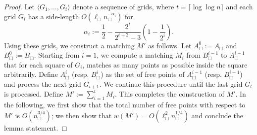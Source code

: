 \documentclass[11pt,onecolumn]{article}
\newcommand{\cell}{\Box}
\begin{document}
\GRSPartialMatching*
\begin{proof}
    Let $\langle G_1, \ldots, G_t\rangle$ denote a sequence of grids, where $t=\lceil \log\log n\rceil$ and each grid $G_i$ has a side-length $O(\ell_\cell n_\cell^{-\alpha_i})$ for \[\alpha_i:=\frac{1}{2} - \frac{2^t}{2^{t+2} - 3}\left(1-\frac{1}{2^i}\right).\]
    Using these grids, we construct a matching $M'$ as follows.
    Let $A_\cell^0:=A_\cell$ and $B_\cell^0:=B_\cell$. Starting from $i=1$, we compute a matching $M_i$ from $B_\cell^{i-1}$ to $A_\cell^{i-1}$ that for each square of $G_i$, matches as many points as possible inside the square arbitrarily. Define $A_\cell^i$ (resp. $B_\cell^i$) as the set of free points of $A_\cell^{i-1}$ (resp. $B_\cell^{i-1}$) and process the next grid $G_{i+1}$. We continue this procedure until the last grid $G_t$ is processed. Define $M':=\sum_{i=1}^t M_i$. This completes the construction of $M'$. In the following, we first show that the total number of free points with respect to $M'$ is $O(n_\cell^{3/4})$; we then show that $w(M')=O(\ell_\cell^2n_\cell^{1/4})$ and conclude the lemma statement.


\end{proof}
\end{document}
